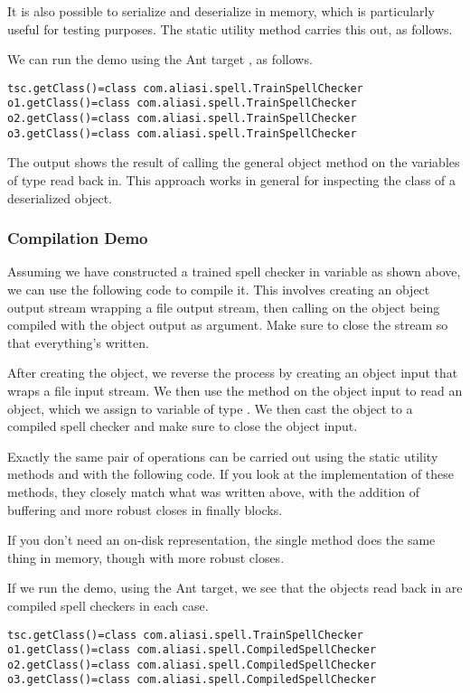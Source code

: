 It is also possible to serialize and deserialize in memory, which
is particularly useful for testing purposes.  The static utility
method  carries this out, as follows.
%

We can run the demo using the Ant target ,
as follows.
%
\begin{verbatim}
tsc.getClass()=class com.aliasi.spell.TrainSpellChecker
o1.getClass()=class com.aliasi.spell.TrainSpellChecker
o2.getClass()=class com.aliasi.spell.TrainSpellChecker
o3.getClass()=class com.aliasi.spell.TrainSpellChecker
\end{verbatim}
%
The output shows the result of calling the general object method
 on the variables of type  read back in.
This approach works in general for inspecting the class of a
deserialized object.


\subsubsection{Compilation Demo}

Assuming we have constructed a trained spell checker in variable
 as shown above, we can use the following code to compile
it.
%
%
This involves creating an object output stream wrapping a file output
stream, then calling  on the object being compiled
with the object output as argument.  Make sure to close the stream so
that everything's written.  

After creating the object, we reverse the process by creating an
object input that wraps a file input stream.  We then use the
 method on the object input to read an object,
which we assign to variable  of type .  We then
cast the object to a compiled spell checker and make sure to close
the object input.

Exactly the same pair of operations can be carried out using the
static utility methods  and 
with the following code.
%
%
If you look at the implementation of these methods, they closely
match what was written above, with the addition of buffering and
more robust closes in finally blocks.

If you don't need an on-disk representation, the single method
 does the same thing in memory, though with more
robust closes.
%
%

If we run the demo, using the  Ant target, we see
that the objects read back in are compiled spell checkers in each
case.
%
\begin{verbatim}
tsc.getClass()=class com.aliasi.spell.TrainSpellChecker
o1.getClass()=class com.aliasi.spell.CompiledSpellChecker
o2.getClass()=class com.aliasi.spell.CompiledSpellChecker
o3.getClass()=class com.aliasi.spell.CompiledSpellChecker
\end{verbatim}



